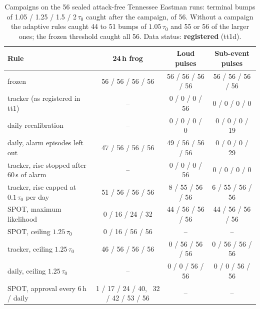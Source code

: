 \documentclass[letterpaper,twocolumn,10pt]{article}
\begin{document}
\begin{table}[t]
\caption{Campaigns on the 56 sealed attack-free Tennessee Eastman runs: terminal bumps of 1.05 / 1.25 /
1.5 / 2\,$\tau_0$ caught after the campaign, of 56. Without a campaign the adaptive rules caught 44 to 51
bumps of $1.05\,\tau_0$ and 55 or 56 of the larger ones; the frozen threshold caught all 56. Data
status: \textbf{registered} (tt1d).}
\label{tab:tepcampaigns}
\begin{tabularx}{\textwidth}{@{}Lccc@{}}
\toprule
Rule & 24\,h frog & Loud pulses & Sub-event pulses \\
\midrule
frozen & 56 / 56 / 56 / 56 & 56 / 56 / 56 / 56 & 56 / 56 / 56 / 56 \\
tracker (as registered in tt1) & -- & 0 / 0 / 0 / 56 & 0 / 0 / 0 / 0 \\
daily recalibration & -- & 0 / 0 / 0 / 0 & 0 / 0 / 0 / 19 \\
daily, alarm episodes left out & 47 / 56 / 56 / 56 & 49 / 56 / 56 / 56 & 0 / 0 / 0 / 29 \\
tracker, rise stopped after 60\,s of alarm & -- & 0 / 0 / 0 / 56 & 0 / 0 / 0 / 0 \\
tracker, rise capped at $0.1\,\tau_0$ per day & 51 / 56 / 56 / 56 & 8 / 55 / 56 / 56 & 6 / 55 / 56 / 56 \\
SPOT, maximum likelihood & 0 / 16 / 24 / 32 & 44 / 56 / 56 / 56 & 44 / 56 / 56 / 56 \\
SPOT, ceiling $1.25\,\tau_0$ & 0 / 16 / 56 / 56 & -- & -- \\
tracker, ceiling $1.25\,\tau_0$ & 46 / 56 / 56 / 56 & 0 / 56 / 56 / 56 & 0 / 56 / 56 / 56 \\
daily, ceiling $1.25\,\tau_0$ & -- & 0 / 0 / 56 / 56 & 0 / 0 / 56 / 56 \\
SPOT, approval every 6\,h / daily & 1 / 17 / 24 / 40, \ 32 / 42 / 53 / 56 & -- & -- \\
\bottomrule
\end{tabularx}
\end{table}
\end{document}

